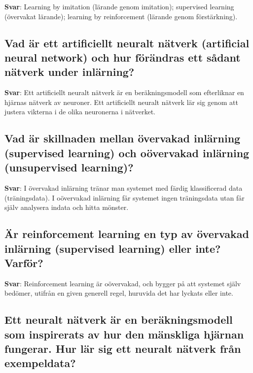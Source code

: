 \documentclass[a4paper,11pt,oneside]{article}
\begin{document}
\begin{sloppypar}
\label{q:313:sa:sv:True}

\textbf{Svar}: Learning by imitation (l\"arande genom imitation); supervised learning (\"overvakat l\"arande); learning by reinforcement (l\"arande genom f\"orst\"arkning).



\subsection{Vad \"ar ett artificiellt neuralt n\"atverk (artificial neural network) och hur f\"or\"andras ett s\r{a}dant n\"atverk under inl\"arning?}

\label{q:314:sa:sv:True}

\textbf{Svar}: Ett artificiellt neuralt n\"atverk \"ar en ber\"akningsmodell som efterliknar en hj\"arnas n\"atverk av neuroner. Ett artificiellt neuralt n\"atverk l\"ar sig genom att justera vikterna i de olika neuronerna i n\"atverket.



\subsection{Vad \"ar skillnaden mellan \"overvakad inl\"arning (supervised learning) och o\"overvakad inl\"arning (unsupervised learning)?}

\label{q:315:sa:sv:True}

\textbf{Svar}: I \"overvakad inl\"arning tr\"anar man systemet med f\"ardig klassificerad data (tr\"aningsdata). I o\"overvakad inl\"arning f\r{a}r systemet ingen tr\"aningsdata utan f\r{a}r sj\"alv analysera indata och hitta m\"onster.



\subsection{\"Ar reinforcement learning en typ av \"overvakad inl\"arning (supervised learning) eller inte? Varf\"or?}

\label{q:316:sa:sv:True}

\textbf{Svar}: Reinforcement learning \"ar o\"overvakad, och bygger p\r{a} att systemet sj\"alv bed\"omer, utifr\r{a}n en given generell regel, huruvida det har lyckats eller inte.



\subsection{Ett neuralt n\"atverk \"ar en ber\"akningsmodell som inspirerats av hur den m\"anskliga hj\"arnan fungerar. Hur l\"ar sig ett neuralt n\"atverk fr\r{a}n exempeldata?}


\end{sloppypar}
\end{document}
